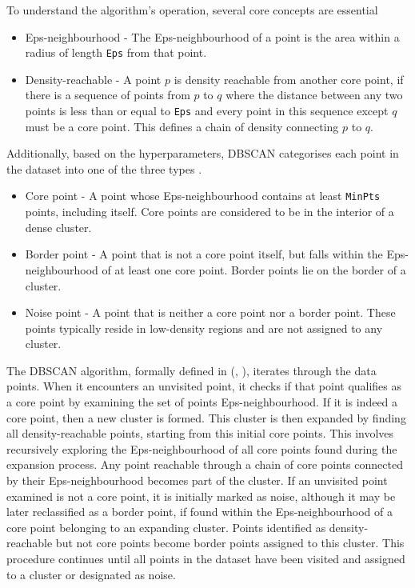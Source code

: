 \documentclass[10pt,oneside]{report}
\renewcommand{\citet}[1]{\citeauthor{#1}, \citeyear{#1}}
\begin{document}
To understand the algorithm's operation, several core concepts are essential \cite{ester1996density} \begin{itemize}
    \item Eps-neighbourhood - The Eps-neighbourhood of a point is the area within a radius of length \texttt{Eps} from that point.
    \item Density-reachable - A point $p$ is density reachable from another core point, if there is a sequence of points from $p$ to $q$ where the distance between any two points is less than or equal to \texttt{Eps} and every point in this sequence except $q$ must be a core point. This defines a chain of density connecting $p$ to $q$.
\end{itemize}

Additionally, based on the hyperparameters, DBSCAN categorises each point in the dataset into one of the three types \cite{ester1996density}. 
\begin{itemize}
    \item Core point - A point whose Eps-neighbourhood contains at least \texttt{MinPts} points, including itself. Core points are considered to be in the interior of a dense cluster.
    \item Border point - A point that is not a core point itself, but falls within the Eps-neighbourhood of at least one core point. Border points lie on the border of a cluster.
    \item Noise point - A point that is neither a core point nor a border point. These points typically reside in low-density regions and are not assigned to any cluster.
\end{itemize}

The DBSCAN algorithm, formally defined in (\citet{ester1996density}), iterates through the data points. When it encounters an unvisited point, it checks if that point qualifies as a core point by examining the set of points Eps-neighbourhood. If it is indeed a core point, then a new cluster is formed. This cluster is then expanded by finding all density-reachable points, starting from this initial core points. This involves recursively exploring the Eps-neighbourhood of all core points found during the expansion process. Any point reachable through a chain of core points connected by their Eps-neighbourhood becomes part of the cluster. If an unvisited point examined is not a core point, it is initially marked as noise, although it may be later reclassified as a border point, if found within the Eps-neighbourhood of a core point belonging to an expanding cluster. Points identified as density-reachable but not core points become border points assigned to this cluster. This procedure continues until all points in the dataset have been visited and assigned to a cluster or designated as noise.
\end{document}
